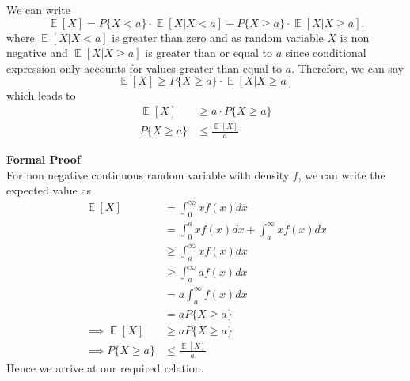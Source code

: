 \begin{solution}
	We can write
	\begin{equation}
		\mathop{\mathbb{E}}[X]= P\{X<a\}\cdot \mathop{\mathbb{E}}[X|X<a]+P\{X\geq a\}\cdot  \mathop{\mathbb{E}}[X|X\geq a].
	\end{equation}
	where $\mathop{\mathbb{E}}[X|X<a]$ is greater than zero and as random variable $X $ is non negative and $\mathop{\mathbb{E}}[X|X\geq a]$ is greater than or equal to $a$ since conditional expression only accounts for values greater than equal to $a$. Therefore, we can say
	\begin{equation}
		\mathop{\mathbb{E}}[X]\geq P\{X\geq a\}\cdot  \mathop{\mathbb{E}}[X|X\geq a]
	\end{equation}
	which leads to
	\begin{align}
		\mathop{\mathbb{E}}[X] & \geq a\cdot P\{X\geq a\}              \\
		P\{X\geq a\}           & \leq \frac{\mathop{\mathbb{E}}[X]}{a}
	\end{align}

	\textbf{Formal Proof} \\
	For non negative continuous random variable with density $f$, we can write the expected value as
	\begin{align}
		\mathop{\mathbb{E}}[X]          & =\int_{0}^{\infty}xf(x)dx                        \\
		                                & = \int_{0}^{a}xf(x)dx + \int_{a}^{\infty}xf(x)dx \\
		                                & \geq \int_{a}^{\infty}xf(x)dx                    \\
		                                & \geq \int_{a}^{\infty}af(x)dx                    \\
		                                & = a \int_{a}^{\infty}f(x)dx                      \\
		                                & =aP\{X\geq a\}                                   \\
		\implies \mathop{\mathbb{E}}[X] & \geq aP\{X\geq a\}                               \\
		\implies P\{X\geq a\}           & \leq \frac{\mathop{\mathbb{E}}[X]}{a}
	\end{align}
	Hence we arrive at our required relation.


\end{solution}
